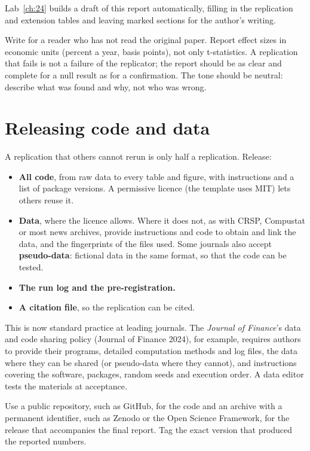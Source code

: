 Lab~\ref{ch:24} builds a draft of this report automatically, filling in the replication and extension tables and leaving marked sections for the author's writing.

Write for a reader who has not read the original paper. Report effect sizes in economic units (percent a year, basis points), not only t-statistics. A replication that fails is not a failure of the replicator; the report should be as clear and complete for a null result as for a confirmation. The tone should be neutral: describe what was found and why, not who was wrong.

\section{Releasing code and data}
\label{sec:24-release}

A replication that others cannot rerun is only half a replication. Release:

\begin{itemize}
  \item \textbf{All code}, from raw data to every table and figure, with instructions and a list of package versions. A permissive licence (the template uses MIT) lets others reuse it.
  \item \textbf{Data}, where the licence allows. Where it does not, as with CRSP, Compustat or most news archives, provide instructions and code to obtain and link the data, and the fingerprints of the files used. Some journals also accept \textbf{pseudo-data}: fictional data in the same format, so that the code can be tested.
  \item \textbf{The run log and the pre-registration.}
  \item \textbf{A citation file}, so the replication can be cited.
\end{itemize}

This is now standard practice at leading journals. The \emph{Journal of Finance}'s data and code sharing policy (Journal of Finance 2024), for example, requires authors to provide their programs, detailed computation methods and log files, the data where they can be shared (or pseudo-data where they cannot), and instructions covering the software, packages, random seeds and execution order. A data editor tests the materials at acceptance.

Use a public repository, such as GitHub, for the code and an archive with a permanent identifier, such as Zenodo or the Open Science Framework, for the release that accompanies the final report. Tag the exact version that produced the reported numbers.

